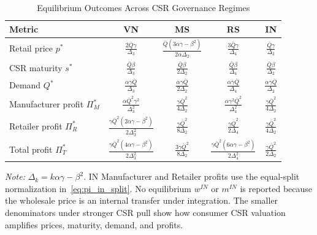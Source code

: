 \begin{table}[htbp]
\centering
\small
\renewcommand{\arraystretch}{1.45}
\setlength{\tabcolsep}{4pt}
\caption{Equilibrium Outcomes Across CSR Governance Regimes}
\label{tab:equilibrium-summary}
\begin{tabular}{@{}lcccc@{}}
\toprule
\textbf{Metric} & \textbf{VN} & \textbf{MS} & \textbf{RS} & \textbf{IN} \\
\midrule
Retail price $p^*$ &
$\displaystyle \frac{2\bar Q\gamma}{\Delta_3}$ &
$\displaystyle \frac{\bar Q(3\alpha\gamma-\beta^2)}{2\alpha\Delta_2}$ &
$\displaystyle \frac{3\bar Q\gamma}{\Delta_4}$ &
$\displaystyle \frac{\bar Q\gamma}{\Delta_2}$ \\[6pt]
CSR maturity $s^*$ &
$\displaystyle \frac{\bar Q\beta}{\Delta_3}$ &
$\displaystyle \frac{\bar Q\beta}{2\Delta_2}$ &
$\displaystyle \frac{\bar Q\beta}{\Delta_4}$ &
$\displaystyle \frac{\bar Q\beta}{\Delta_2}$ \\[6pt]
Demand $Q^*$ &
$\displaystyle \frac{\alpha\gamma\bar Q}{\Delta_3}$ &
$\displaystyle \frac{\alpha\gamma\bar Q}{2\Delta_2}$ &
$\displaystyle \frac{\alpha\gamma\bar Q}{\Delta_4}$ &
$\displaystyle \frac{\alpha\gamma\bar Q}{\Delta_2}$ \\[6pt]
Manufacturer profit $\Pi_M^*$ &
$\displaystyle \frac{\alpha\bar Q^2\gamma^2}{\Delta_3^2}$ &
$\displaystyle \frac{\gamma\bar Q^2}{4\Delta_2}$ &
$\displaystyle \frac{\alpha\gamma^2\bar Q^2}{\Delta_4^2}$ &
$\displaystyle \frac{\gamma\bar Q^2}{4\Delta_2}$ \\[8pt]
Retailer profit $\Pi_R^*$ &
$\displaystyle \frac{\gamma\bar Q^2(2\alpha\gamma-\beta^2)}{2\Delta_3^2}$ &
$\displaystyle \frac{\gamma\bar Q^2}{8\Delta_2}$ &
$\displaystyle \frac{\gamma\bar Q^2}{2\Delta_4}$ &
$\displaystyle \frac{\gamma\bar Q^2}{4\Delta_2}$ \\[8pt]
Total profit $\Pi_T^*$ &
$\displaystyle \frac{\gamma\bar Q^2(4\alpha\gamma-\beta^2)}{2\Delta_3^2}$ &
$\displaystyle \frac{3\gamma\bar Q^2}{8\Delta_2}$ &
$\displaystyle \frac{\gamma\bar Q^2(6\alpha\gamma-\beta^2)}{2\Delta_4^2}$ &
$\displaystyle \frac{\gamma\bar Q^2}{2\Delta_2}$ \\
\bottomrule
\end{tabular}
\vspace{0.4em}
\begin{minipage}{0.95\textwidth}
\footnotesize
\textit{Note:} $\Delta_k=k\alpha\gamma-\beta^2$. IN Manufacturer and Retailer profits use the equal-split normalization in~\eqref{eq:pi_in_split}. No equilibrium $w^{IN}$ or $m^{IN}$ is reported because the wholesale price is an internal transfer under integration. The smaller denominators under stronger CSR pull show how consumer CSR valuation amplifies prices, maturity, demand, and profits.
\end{minipage}
\end{table}

